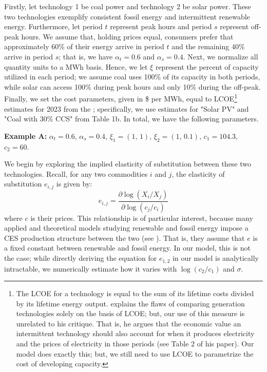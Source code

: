 \documentclass[11pt,a4paper]{extarticle}
\begin{document}
Firstly, let technology 1 be coal power and technology 2 be solar power. These two technologies exemplify consistent fossil energy and intermittent renewable energy. Furthermore,  let period $t$ represent peak hours and period $s$ represent off-peak hours. We assume that, holding prices equal, consumers prefer that approximately 60\% of their energy arrive in period $t$ and the remaining 40\% arrive in period $s$; that is, we have $\alpha_t = 0.6$ and $\alpha_s = 0.4$. Next, we normalize all quantity units to a MWh basis. Hence, we let $\xi$ represent the percent of capacity utilized in each period; we assume coal uses 100\% of its capacity in both periods, while solar can access 100\% during peak hours and only 10\% during the off-peak. Finally, we set the cost parameters, given in  \$ per MWh, equal to LCOE\footnote{ The LCOE for a technology is equal to the sum of its lifetime costs divided by its lifetime energy output. \citet{Joskow2011} explains the flaws of comparing generation technologies solely on the basis of LCOE; but,  our use of this measure is unrelated to his critique. That is, he argues that the economic value an intermittent technology should also account for when it produces electricity and the prices of electricity in those periods (see Table 2 of his paper). Our model does exactly this; but, we still need to  use LCOE to parametrize the cost of developing capacity. } estimates for 2023 from the \citet{EIALCOE}; specifically, we use estimates for "Solar PV" and "Coal with 30\% CCS" from Table 1b.  In total, we have the following parameters. 

\begin{center}
	\noindent \textbf{Example  A:} $\alpha_t = 0.6$, $\alpha_s = 0.4$, $\xi_1 = (1, \, 1)$, $\xi_2 = (1, \, 0.1)$, $c_1 = 104.3$, $c_2 = 60$. 
	\label{Params: Example A}
\end{center}



We begin by exploring the implied elasticity of substitution between these two technologies. Recall, for any two commodities $i$ and $j$,  the elasticity of substitution $e_{i,j}$ is given by:
$$e_{i,j} = \frac{\partial \log (X_i/ X_j)}{\partial \log (c_j/c_i)}$$
where $c$ is their prices. This relationship is of particular interest, because many applied and theoretical models studying renewable and fossil energy impose a CES production structure between the two (see \citet{Pap}). That is, they assume that $e$ is a fixed constant between renewable and fossil energy. In our model, this is not the case; while directly deriving the equation for $e_{1,2}$ in our model is analytically intractable, we numerically estimate how it varies with $\log (c_2/c_1)$ and $\sigma$.
\end{document}
